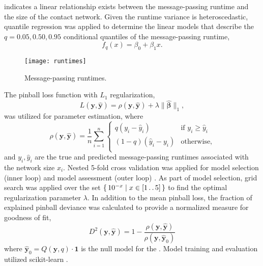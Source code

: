  indicates a linear relationship exists between the message-passing runtime and the size of the contact network. Given the runtime variance is heteroscedastic, quantile regression \cite{Koenker1978} was applied to determine the linear models that describe the $q = 0.05, 0.50, 0.95$ conditional quantiles of the message-passing runtime,
\begin{equation}\label{eq:runtime-model}
  f_q(x) = \beta_{0} + \beta_{1} x.
\end{equation}

\begin{sidewaysfigure}[htbp]
  \centering
  \texttt{[image: runtimes]}
  \caption[Message-passing runtimes]{Message-passing runtimes.}
  \label{fig:runtimes}
\end{sidewaysfigure}


The pinball loss function \cite{Takeuchi2006} with $L_1$ regularization,
\begin{equation*}
  L(\mathbf{y}, \hat{\mathbf{y}}) = \rho(\mathbf{y}, \hat{\mathbf{y}}) + \lambda \|\hat{\boldsymbol{\beta}} \|_1,
\end{equation*}
was utilized for parameter estimation, where
\begin{equation*}
  \rho(\mathbf{y}, \hat{\mathbf{y}}) = \frac{1}{n} \sum_{i=1}^{n} \begin{cases}
    q(y_i - \hat{y}_i) & \text{if $y_i \geq \hat{y}_i$} \\
    (1 - q)(\hat{y}_i - y_i) & \text{otherwise}, \\
  \end{cases}
\end{equation*}
and $y_i, \hat{y}_i$ are the true and predicted message-passing runtimes associated with the network size $x_i$. Nested 5-fold cross validation \cite{Cawley2010} was applied for model selection (inner loop) and model assessment (outer loop) \cite[p. 222]{Hastie2009}. As part of model selection, grid search was applied over the set $\set{ 10^{-x} | x \in [1 \mathinner{\ldotp \ldotp} 5]}$ to find the optimal regularization parameter $\lambda$. In addition to the mean pinball loss, the fraction of explained pinball deviance \cite{Koenker1999, Hastie2015} was calculated to provide a normalized measure for goodness of fit,
\begin{equation*}
  D^2(\mathbf{y}, \hat{\mathbf{y}}) = 1 - \frac{\rho(\mathbf{y}, \hat{\mathbf{y}})}{\rho(\mathbf{y}, \hat{\mathbf{y}}_0)}
\end{equation*}
where $\hat{\mathbf{y}}_0 = Q(\mathbf{y}, q) \cdot \mathbf{1}$ is the null model for the . Model training and evaluation utilized scikit-learn \cite{Pedregosa20211}.

